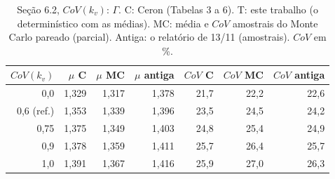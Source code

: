 \begin{table}[htbp]\centering\scriptsize\setlength{\tabcolsep}{3pt}
\caption{Seção 6.2, $CoV(k_v)$: $\Gamma$. C: Ceron (Tabelas 3 a 6). T: este trabalho (o determinístico com as médias). MC: média e $CoV$ amostrais do Monte Carlo pareado (parcial). Antiga: o relatório de 13/11 (amostrais). $CoV$ em \%.}\label{tab:g_covk}
\begin{tabular}{rrrrrrr}\toprule
$CoV(k_v)$ & $\mu$ C & $\mu$ MC & $\mu$ antiga & $CoV$ C & $CoV$ MC & $CoV$ antiga \\\midrule
0{,}0 & 1{,}329 & 1{,}317 & 1{,}378 & 21{,}7 & 22{,}2 & 22{,}6 \\
0{,}6 (ref.) & 1{,}353 & 1{,}339 & 1{,}396 & 23{,}5 & 24{,}5 & 24{,}2 \\
0{,}75 & 1{,}375 & 1{,}349 & 1{,}403 & 24{,}8 & 25{,}4 & 24{,}9 \\
0{,}9 & 1{,}378 & 1{,}359 & 1{,}411 & 25{,}7 & 26{,}4 & 25{,}7 \\
1{,}0 & 1{,}391 & 1{,}367 & 1{,}416 & 25{,}9 & 27{,}0 & 26{,}3 \\
\bottomrule\end{tabular}\end{table}
